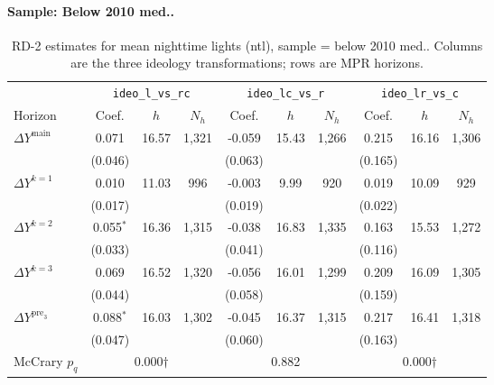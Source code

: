 \documentclass[11pt]{article}
\begin{document}
\paragraph{Sample: Below 2010 med..}
\begin{table}[H]
\centering
\scriptsize
\caption{RD-2 estimates for mean nighttime lights (ntl), sample = below 2010 med..
Columns are the three ideology transformations; rows are MPR horizons.}
\label{tab:rd2_mean_night_below}
\begin{tabular}{l ccc ccc ccc}
\toprule
 & \multicolumn{3}{c}{\texttt{ideo\_l\_vs\_rc}}
 & \multicolumn{3}{c}{\texttt{ideo\_lc\_vs\_r}}
 & \multicolumn{3}{c}{\texttt{ideo\_lr\_vs\_c}} \\
\cmidrule(lr){2-4} \cmidrule(lr){5-7} \cmidrule(lr){8-10}
Horizon & Coef. & $h$ & $N_h$ & Coef. & $h$ & $N_h$ & Coef. & $h$ & $N_h$ \\
\midrule
$\Delta Y^{\text{main}}$ & 0.071 & 16.57 & 1,321 & -0.059 & 15.43 & 1,266 & 0.215 & 16.16 & 1,306 \\
 & (0.046) &  &  & (0.063) &  &  & (0.165) &  &  \\
\addlinespace[1pt]
$\Delta Y^{k=1}$ & 0.010 & 11.03 & 996 & -0.003 & 9.99 & 920 & 0.019 & 10.09 & 929 \\
 & (0.017) &  &  & (0.019) &  &  & (0.022) &  &  \\
\addlinespace[1pt]
$\Delta Y^{k=2}$ & 0.055$^{*}$ & 16.36 & 1,315 & -0.038 & 16.83 & 1,335 & 0.163 & 15.53 & 1,272 \\
 & (0.033) &  &  & (0.041) &  &  & (0.116) &  &  \\
\addlinespace[1pt]
$\Delta Y^{k=3}$ & 0.069 & 16.52 & 1,320 & -0.056 & 16.01 & 1,299 & 0.209 & 16.09 & 1,305 \\
 & (0.044) &  &  & (0.058) &  &  & (0.159) &  &  \\
\addlinespace[1pt]
$\Delta Y^{\text{pre}_3}$ & 0.088$^{*}$ & 16.03 & 1,302 & -0.045 & 16.37 & 1,315 & 0.217 & 16.41 & 1,318 \\
 & (0.047) &  &  & (0.060) &  &  & (0.163) &  &  \\
\addlinespace[1pt]
\midrule
McCrary $p_q$ & \multicolumn{3}{c}{0.000$\dagger$} & \multicolumn{3}{c}{0.882} & \multicolumn{3}{c}{0.000$\dagger$} \\
\bottomrule
\end{tabular}
\end{table}
\end{document}
